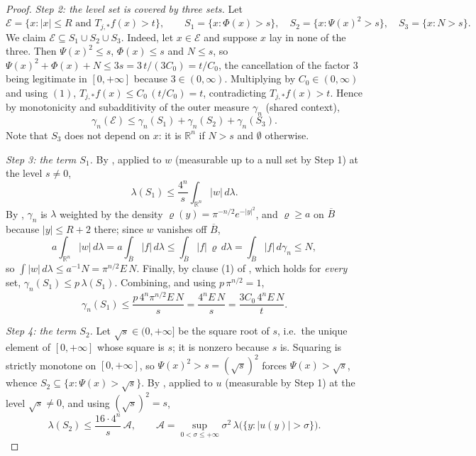 \begin{proof}
\emph{Step 2: the level set is covered by three sets.}
Let
\[
  \mathcal{E} = \bigl\{x : |x| \leq R \text{ and } T_{j,*}f(x) > t\bigr\},
  \qquad
  S_1 = \{x : \Phi(x) > s\},\quad
  S_2 = \{x : \Psi(x)^2 > s\},\quad
  S_3 = \{x : N > s\} .
\]
We claim $\mathcal{E} \subseteq S_1 \cup S_2 \cup S_3$.  Indeed, let
$x \in \mathcal{E}$ and suppose $x$ lay in none of the three.  Then
$\Psi(x)^2 \leq s$, $\Phi(x) \leq s$ and $N \leq s$, so
$\Psi(x)^2 + \Phi(x) + N \leq 3s = 3\,t/(3C_0) = t/C_0$, the cancellation of
the factor $3$ being legitimate in $[0,+\infty]$ because $3 \in (0,\infty)$.
Multiplying by $C_0 \in (0,\infty)$ and using $(1)$,
$T_{j,*}f(x) \leq C_0\,(t/C_0) = t$, contradicting $T_{j,*}f(x) > t$.  Hence
by monotonicity and subadditivity of the outer measure $\gamma_n$ (shared
context),
\begin{equation*}
  \gamma_n(\mathcal{E}) \leq \gamma_n(S_1) + \gamma_n(S_2) + \gamma_n(S_3) .
  \tag{2}
\end{equation*}
Note that $S_3$ does not depend on $x$: it is $\mathbb{R}^n$ if $N > s$ and
$\emptyset$ otherwise.

\emph{Step 3: the term $S_1$.}
By , applied to $w$ (measurable up to a null set
by Step 1) at the level $s \neq 0$,
\[
  \lambda(S_1) \leq \frac{4^n}{s}\int_{\mathbb{R}^n}|w|\,d\lambda .
\]
By , $\gamma_n$ is $\lambda$ weighted by the density
$\varrho(y) = \pi^{-n/2}e^{-|y|^2}$, and $\varrho \geq a$ on $\overline B$
because $|y| \leq R+2$ there; since $w$ vanishes off $\overline B$,
\[
  a\int_{\mathbb{R}^n}|w|\,d\lambda
    = a\int_{\overline B}|f|\,d\lambda
    \leq \int_{\overline B}|f|\,\varrho\,d\lambda
    = \int_{\overline B}|f|\,d\gamma_n \leq N ,
\]
so $\int|w|\,d\lambda \leq a^{-1}N = \pi^{n/2}E\,N$.  Finally, by clause (1) of
, which holds for \emph{every} set,
$\gamma_n(S_1) \leq p\,\lambda(S_1)$.  Combining, and using
$p\,\pi^{n/2} = 1$,
\begin{equation*}
  \gamma_n(S_1) \leq \frac{p\,4^n\pi^{n/2}E\,N}{s}
    = \frac{4^nE\,N}{s} = \frac{3C_0\,4^nE\,N}{t} . \tag{3}
\end{equation*}

\emph{Step 4: the term $S_2$.}
Let $\sqrt s \in (0,+\infty]$ be the square root of $s$, i.e.\ the unique
element of $[0,+\infty]$ whose square is $s$; it is nonzero because $s$ is.
Squaring is strictly monotone on $[0,+\infty]$, so $\Psi(x)^2 > s = (\sqrt s)^2$
forces $\Psi(x) > \sqrt s$, whence
$S_2 \subseteq \{x : \Psi(x) > \sqrt s\}$.  By
, applied to $u$ (measurable by Step 1) at the
level $\sqrt s \neq 0$, and using $(\sqrt s)^2 = s$,
\begin{equation*}
  \lambda(S_2) \leq \frac{16\cdot4^n}{s}\,\mathcal{A},
  \qquad
  \mathcal{A} = \sup_{0<\sigma\leq+\infty}
      \sigma^2\,\lambda\bigl(\{y : |u(y)| > \sigma\}\bigr) . \tag{4}
\end{equation*}


\end{proof}
